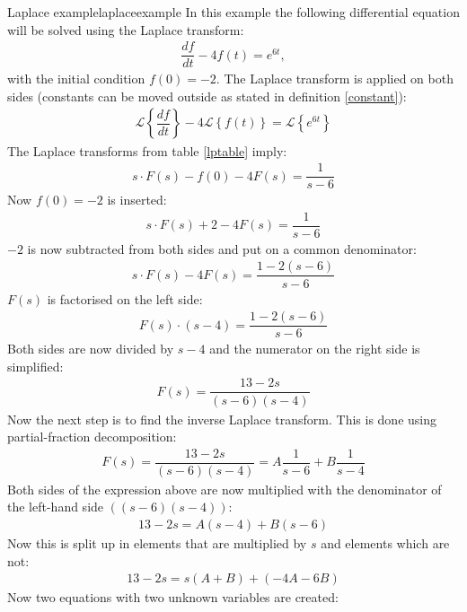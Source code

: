 \begin{example}{Laplace example}{laplaceexample}
In this example the following differential equation will be solved using the Laplace transform:
\begin{align}
\dfrac{df}{dt}-4f(t)=e^{6t}, \label{lpexinieq}
\end{align} 
with the initial condition $f(0)=-2$. The Laplace transform is applied on both sides (constants can be moved outside as stated in definition \ref{constant}):
\begin{align*}
\mathcal{L} \left\{\dfrac{df}{dt} \right\}-4 
\mathcal{L} \left\{f(t) \right\} = 
\mathcal{L} \left\{e^{6t} \right\}
\end{align*}
The Laplace transforms from table \ref{lptable} imply:
\begin{align*}
s \cdot F(s) - f(0) - 4F(s)= \dfrac{1}{s-6}
\end{align*}
Now $f(0)=-2$ is inserted:
\begin{align*}
s \cdot F(s) + 2 - 4F(s)= \dfrac{1}{s-6}
\end{align*}
$-2$ is now subtracted from both sides and put on a common denominator:
\begin{align*}
s \cdot F(s) - 4F(s)= \dfrac{1-2(s-6)}{s-6}
\end{align*}
$F(s)$ is factorised on the left side:
\begin{align*}
F(s) \cdot (s-4) = \dfrac{1-2(s-6)}{s-6}
\end{align*}
Both sides are now divided by $s-4$ and the numerator on the right side is simplified:
\begin{align*}
F(s) = \dfrac{13-2s}{(s-6)(s-4)}
\end{align*}
Now the next step is to find the inverse Laplace transform. This is done using partial-fraction decomposition: \cite[p. 537]{calc}
\begin{align}
F(s) = \dfrac{13-2s}{(s-6)(s-4)} = A \dfrac{1}{s-6} + B \dfrac{1}{s-4}
\label{par_dec}
\end{align}
Both sides of the expression above are now multiplied with the denominator of the left-hand side $((s-6)(s-4))$:
\begin{align*}
13-2s = A(s-4) + B(s-6)
\end{align*}
Now this is split up in elements that are multiplied by $s$ and elements which are not:
\begin{align*}
13-2s = s(A+B)+(-4A-6B)
\end{align*}
Now two equations with two unknown variables are created:
\begin{align*}

\end{align*}
\end{example}
